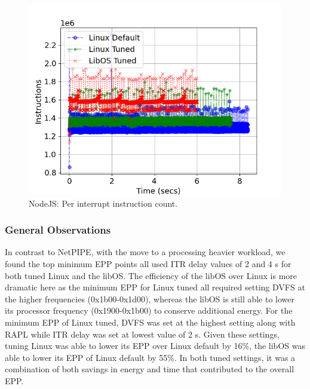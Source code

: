\begin{figure}[t]
	\includegraphics[width=\columnwidth]{osdi_figures/nodejs_instructions_timeline.png}
	\caption{NodeJS: Per interrupt instruction count.}
	\label{fig:nodejs_instruction}
\end{figure}

\subsubsection{General Observations}
In contrast to NetPIPE, with the move to a processing heavier workload, we found the top minimum EPP points all used ITR delay values of 2 and 4 \micro s for both tuned Linux and the libOS. The efficiency of the libOS over Linux is more dramatic here as the minimum EPP for Linux tuned all required setting DVFS at the higher frequencies (0x1b00-0x1d00), whereas the libOS is still able to lower its processor frequency (0x1900-0x1b00) to conserve additional energy. For the minimum EPP of Linux tuned, DVFS was set at the highest setting along with RAPL while ITR delay was set at lowest value of 2 \micro s. Given these settings, tuning Linux was able to lower its EPP over Linux default by 16\%, the libOS was able to lower its EPP of Linux default by 55\%. In both tuned settings, it was a combination of both savings in energy and time that contributed to the overall EPP.

